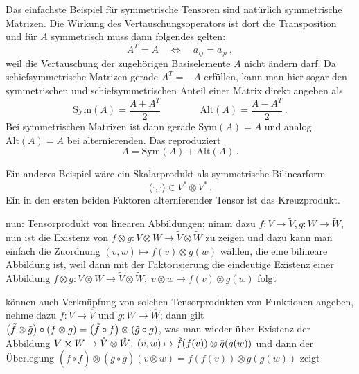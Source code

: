 \documentclass[../H_Analysis_main.tex]{subfiles}
\begin{document}
\begin{bsp}\label{bsp:symmalttens}
Das einfachste Beispiel für symmetrische Tensoren sind natürlich symmetrische Matrizen. Die Wirkung des Vertauschungsoperators ist dort die Transposition und für $A$ symmetrisch muss dann folgendes gelten:
\begin{equation}
A ^T= A \quad \Leftrightarrow \quad a_{ij} = a_{ji} \, ,
\end{equation}
weil die Vertauschung der zugehörigen Basiselemente $A$ nicht ändern darf. Da schiefsymmetrische Matrizen gerade $A^T = -A$ erfüllen, kann man hier sogar den symmetrischen und schiefsymmetrischen Anteil einer Matrix direkt angeben als
\begin{equation}
\text{Sym}(A) = \frac{A + A^T}{2} \qquad \qquad \text{Alt}(A) = \frac{A - A^T}{2} \, .
\end{equation}
Bei symmetrischen Matrizen ist dann gerade $\text{Sym}(A) = A$ und analog $\text{Alt}(A) = A$ bei alternierenden. Das reproduziert
\begin{equation*}
A = \text{Sym}(A) + \text{Alt}(A) \, .
\end{equation*}

Ein anderes Beispiel wäre ein Skalarprodukt als symmetrische Bilinearform
\begin{equation}
\langle \cdot, \cdot \rangle \in V^* \otimes V^* \, .
\end{equation}
Ein in den ersten beiden Faktoren alternierender Tensor ist das Kreuzprodukt.
\end{bsp}



nun: Tensorprodukt von linearen Abbildungen; nimm dazu $f: V \rightarrow \tilde{V}, g: W \rightarrow \tilde{W}$, nun ist die Existenz von $f \otimes g: V \otimes W \rightarrow \tilde{V} \otimes \tilde{W}$ zu zeigen und dazu kann man einfach die Zuordnung $(v, w) \mapsto f(v) \otimes g(w)$ wählen, die eine bilineare Abbildung ist, weil dann mit der Faktorisierung die eindeutige Existenz einer Abbildung $f \otimes g: V \otimes W \rightarrow \tilde{V} \otimes \tilde{W}, \; v \otimes w \mapsto f(v) \otimes g(w)$ folgt

können auch Verknüpfung von solchen Tensorprodukten von Funktionen angeben, nehme dazu $\tilde{f}: \tilde{V} \rightarrow \hat{V}$ und $\tilde{g}: \tilde{W} \rightarrow \hat{W}$; dann gilt $\qty(\tilde{f} \otimes \tilde{g}) \circ \qty(f \otimes g) = \qty(\tilde{f} \circ f) \otimes \qty(\tilde{g} \circ g)$, was man wieder über Existenz der Abbildung $V \cross W \rightarrow \hat{V} \otimes \hat{W}, \; (v, w) \mapsto \tilde{f}(f(v)) \otimes \tilde{g}(g(w))$ und dann der Überlegung $(\tilde{f} \circ f) \otimes (\tilde{g} \circ g) (v \otimes w) = \tilde{f}(f(v)) \otimes \tilde{g}(g(w))$ zeigt
\end{document}
